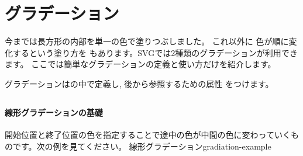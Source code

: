 \section{グラデーション}
今までは長方形の内部を単一の色で塗りつぶしました。
これ以外に
色が順に変化するという塗り方を
もあります。SVGでは2種類のグラデーションが利用できます。
ここでは簡単なグラデーションの定義と使い方だけを紹介します。

グラデーションはの中で定義し, 後から参照するための属性
をつけます。
\subsection{}
\paragraph{線形グラデーションの基礎}
開始位置と終了位置の色を指定することで途中の色が中間の色に変わっていくも
のです。次の例を見てください。
{}
    {線形グラデーション}{gradiation-example}
